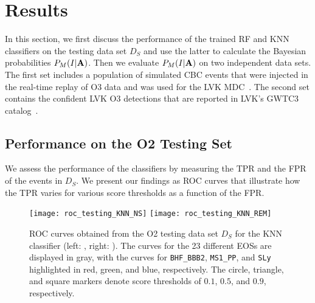 \section{Results} \label{results}

In this section, we first discuss the performance of the trained \ac{RF} and \ac{KNN} classifiers on the testing data set $D_S$ and use the latter to calculate the Bayesian probabilities
$P_M(I|{\bf A})$. Then we evaluate $P_M(I|{\bf A})$ on two independent data sets. The first set includes a population of simulated \ac{CBC} events that were injected in the real-time replay of
\ac{O3} data and was used for the \ac{LVK} \ac{MDC}~\cite{Chaudhary:2023vec}. The second set contains the confident \ac{LVK} \ac{O3} detections that are reported in \ac{LVK}'s \ac{GWTC3}
catalog~\cite{LIGOScientific:2021djp}.

\subsection{Performance on the \ac{O2} Testing Set}

We assess the performance of the classifiers by measuring the \ac{TPR} and the \ac{FPR} of the events in $D_S$. We present our findings as \ac{ROC} curves that illustrate how the \ac{TPR} varies
for various score thresholds as a function of the \ac{FPR}.

\begin{figure}%
\texttt{[image: roc\_testing\_KNN\_NS]}
\texttt{[image: roc\_testing\_KNN\_REM]}
\caption{\ac{ROC} curves obtained from the \ac{O2} testing data set $D_S$ for the \ac{KNN} classifier (left: \hasns, right: \hasrem). The curves for the 23 different \ac{EOS}s are displayed in
gray, with the curves for {\tt BHF\_BBB2}, {\tt MS1\_PP}, and {\tt SLy} highlighted in red, green, and blue, respectively. The circle, triangle, and square markers denote score thresholds of
$0.1$, $0.5$, and $0.9$, respectively.}
\label{fig:rocO2_KNN}
\end{figure}

